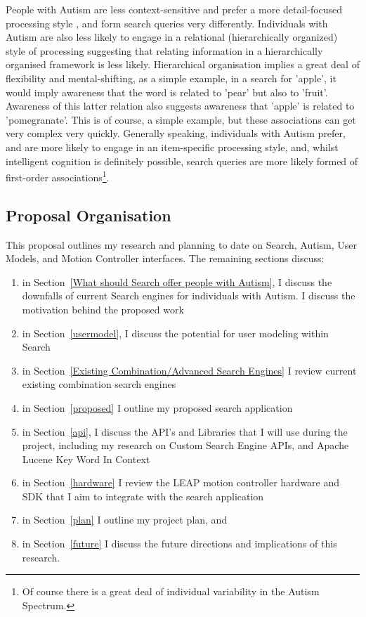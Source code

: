 \documentclass[10pt]{article}
\begin{document}
 People with Autism are less context-sensitive and prefer a more detail-focused processing style \cite{mottron}, and form search queries very differently. Individuals with Autism are also less likely to engage in a relational (hierarchically organized) style of processing \cite{bowler} suggesting that relating information in a hierarchically organised framework is less likely. Hierarchical organisation implies a great deal of flexibility and mental-shifting, as a simple example, in a search for 'apple', it would imply awareness that the word is related to 'pear' but also to 'fruit'. Awareness of this latter relation also suggests awareness that 'apple' is related to 'pomegranate'. This is of course, a simple example, but these associations can get very complex very quickly. Generally speaking, individuals with Autism prefer, and are more likely to engage in an item-specific processing style, and, whilst intelligent cognition is definitely possible, search queries are more likely formed of first-order associations\footnote{Of course there is a great deal of individual variability in the Autism Spectrum.}. \\


\subsection{Proposal Organisation}

This proposal outlines my research and planning to date on Search, Autism, User Models, and Motion Controller interfaces. The remaining sections discuss:
\begin{enumerate}
\item in Section~\ref{What should Search offer people with Autism}, I discuss the downfalls of current Search engines for individuals with Autism. I discuss the motivation behind the proposed work
\item in Section~\ref{usermodel}, I discuss the potential for user modeling within Search
\item in Section~\ref{Existing Combination/Advanced Search Engines} I review current existing combination search engines 
\item in Section~\ref{proposed} I outline my proposed search application
\item in Section~\ref{api}, I discuss the API's and Libraries that I will use during the project, including my research on Custom Search Engine APIs, and Apache Lucene Key Word In Context
\item in Section~\ref{hardware} I review the LEAP motion controller hardware and SDK that I aim to integrate with the search application
\item in Section~\ref{plan} I outline my project plan, and
\item in Section~\ref{future} I discuss the future directions and implications of this research.
\end{enumerate}
\end{document}
